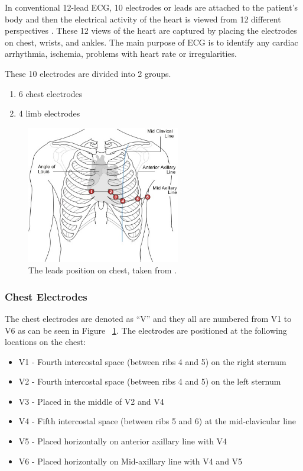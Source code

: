 In conventional 12-lead ECG, 10 electrodes or leads are attached to the patient's body and then the electrical activity of the heart is viewed from 12 different perspectives \cite{cablesandsensors}. These 12 views of the heart are captured by placing the electrodes on chest, wrists, and ankles. The main purpose of ECG is to identify any cardiac arrhythmia, ischemia, problems with heart rate or irregularities.

These 10 electrodes are divided into 2 groups. 
\begin{enumerate}
	\item 6 chest electrodes
	\item 4 limb electrodes
\end{enumerate}

\begin{figure}[htpb]
	\centering
	\includegraphics[width=\textwidth,height=6cm,keepaspectratio=true]{images/6_lead_placement}
	\caption{
		The leads position on chest, taken from \cite{TUON:six_leads}.
	}
	\label{fig:6_lead_placement}
\end{figure}


\subsubsection{Chest Electrodes}
The chest electrodes are denoted as ``V'' and they all are numbered from V1 to V6 as can be seen in Figure ~\ref{fig:6_lead_placement}. The electrodes are positioned at the following locations on the chest:

\begin{itemize}
	\item V1 - Fourth intercostal space (between ribs 4 and 5) on the right sternum
	\item V2 - Fourth intercostal space (between ribs 4 and 5) on the left sternum
	\item V3 - Placed in the middle of V2 and V4
	\item V4 - Fifth intercostal space (between ribs 5 and 6) at the mid-clavicular line
	\item V5 - Placed horizontally on anterior axillary line with V4
	\item V6 - Placed horizontally on Mid-axillary line with V4 and V5
\end{itemize} 


